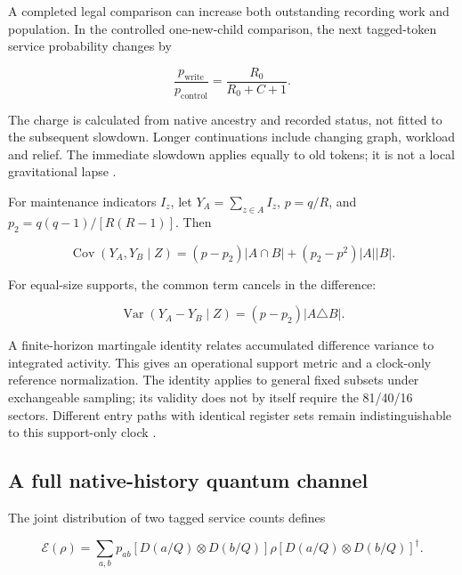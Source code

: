 \documentclass[11pt,a4paper]{article}
\begin{document}
A completed legal comparison can increase both outstanding recording work and population. In the controlled one-new-child comparison, the next tagged-token service probability changes by

\begin{equation}\label{eq:8}
\frac{p_{\mathrm{write}}}{p_{\mathrm{control}}}
=\frac{R_0}{R_0+C+1}.
\end{equation}

The charge is calculated from native ancestry and recorded status, not fitted to the subsequent slowdown. Longer continuations include changing graph, workload and relief. The immediate slowdown applies equally to old tokens; it is not a local gravitational lapse \cite{R25,R29}.

For maintenance indicators \(I_z\), let \(Y_A=\sum_{z\in A}I_z\), \(p=q/R\), and \(p_2=q(q-1)/[R(R-1)]\). Then

\begin{equation}\label{eq:9}
\operatorname{Cov}(Y_A,Y_B\mid Z)
=(p-p_2)|A\cap B|+(p_2-p^2)|A||B|.
\end{equation}

For equal-size supports, the common term cancels in the difference:

\begin{equation}\label{eq:10}
\operatorname{Var}(Y_A-Y_B\mid Z)
=(p-p_2)|A\triangle B|.
\end{equation}

A finite-horizon martingale identity relates accumulated difference variance to integrated activity. This gives an operational support metric and a clock-only reference normalization. The identity applies to general fixed subsets under exchangeable sampling; its validity does not by itself require the 81/40/16 sectors. Different entry paths with identical register sets remain indistinguishable to this support-only clock \cite{R26}.

\subsection{A full native-history quantum channel}\label{a-full-native-history-quantum-channel}

The joint distribution of two tagged service counts defines

\begin{equation}\label{eq:11}
\mathcal E(\rho)=\sum_{a,b}p_{ab}
[D(a/Q)\otimes D(b/Q)]\rho[D(a/Q)\otimes D(b/Q)]^\dagger.
\end{equation}
\end{document}
